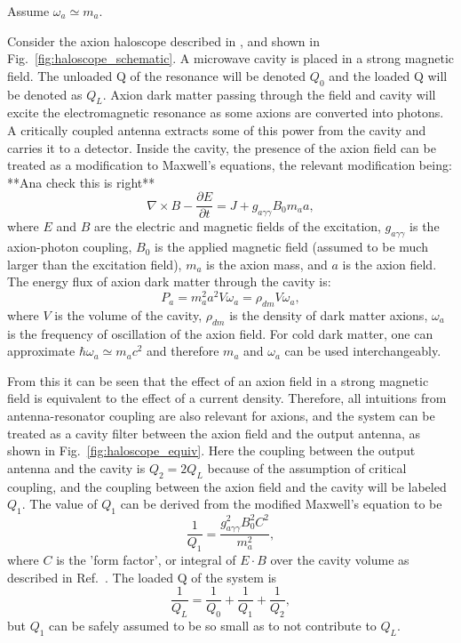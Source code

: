 \documentclass[aps,prl,twocolumn,groupedaddress]{revtex4-1}
\begin{document}
Assume $\omega_a\simeq m_a$.

Consider the axion haloscope described in \cite{sikiviepaper}, and shown in Fig.~\ref{fig:haloscope_schematic}.
A microwave cavity is placed in a strong magnetic field.  The unloaded Q of the resonance will be denoted $Q_0$ and the loaded Q will be denoted as $Q_L$.  Axion dark matter passing through the field and cavity will excite the electromagnetic resonance as some axions are converted into photons.  
A critically coupled antenna extracts some of this power from the cavity and carries it to a detector.
Inside the cavity, the presence of the axion field can be treated as a modification to Maxwell's equations, the relevant modification being: **Ana check this is right**
\begin{equation}
\nabla \times B - \frac{\partial E}{\partial t} = J + g_{a\gamma\gamma}B_0m_a a,
\end{equation}
where $E$ and $B$ are the electric and magnetic fields of the excitation, $g_{a\gamma\gamma}$ is the axion-photon coupling, $B_0$ is the applied magnetic field (assumed to be much larger than the excitation field), $m_a$ is the axion mass, and $a$ is the axion field.  The energy flux of axion dark matter through the cavity is:
\begin{equation}
P_{a}=m_a^2a^2V\omega_a=\rho_{dm}V\omega_a,
\end{equation}
where $V$ is the volume of the cavity, $\rho_{dm}$ is the density of dark matter axions, $\omega_a$ is the frequency of oscillation of the axion field.  For cold dark matter, one can approximate $\hbar \omega_a \simeq m_a c^2$ and therefore $m_a$ and $\omega_a$ can be used interchangeably.

From this it can be seen that the effect of an axion field in a strong magnetic field is equivalent to the effect of a current density.  
Therefore, all intuitions from antenna-resonator coupling are also relevant for axions, and the system can be treated as a cavity filter between the axion field and the output antenna, as shown in Fig.~\ref{fig:haloscope_equiv}.  Here the coupling between the output antenna and the cavity is $Q_2 = 2 Q_L$ because of the assumption of critical coupling, and the coupling between the axion field and the cavity will be labeled $Q_1$.  The value of $Q_1$ can be derived from the modified Maxwell's equation to be 
\begin{equation}
\frac{1}{Q_1}=\frac{g^2_{a\gamma\gamma}B_0^2 C^2}{m_a^2},
\end{equation}
where $C$ is the 'form factor', or integral of $E\cdot B$ over the cavity volume as described in Ref.~\cite{sikiviepaper}.  The loaded Q of the system is
\begin{equation}
\frac{1}{Q_L}=\frac{1}{Q_0}+\frac{1}{Q_1}+\frac{1}{Q_2},
\end{equation}
but $Q_1$ can be safely assumed to be so small as to not contribute to $Q_L$.
\end{document}
